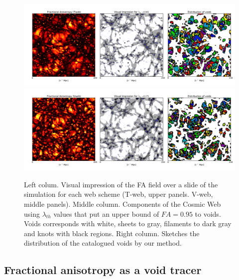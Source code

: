 \documentclass[a4,useAMS,usenatbib,usegraphicx]{latex/mn2e}
\begin{document}
\begin{figure}
  \includegraphics[trim = 16mm 10mm 5mm 12mm, clip, keepaspectratio=true,
  width=0.73\textheight]{./figures/cosmicweb_FA_Tweb.pdf}
  \vspace{0.1 cm}
  \includegraphics[trim = 16mm 10mm 5mm 12mm, clip, keepaspectratio=true,
  width=0.73\textheight]{./figures/cosmicweb_FA_Vweb.pdf}
  \caption{Left colum. Visual impression of the 
  FA field over a slide of the simulation for each web scheme (T-web, upper 
  panels. V-web, middle panels). 
  Middle column. Components of the Cosmic Web using $\lambda_{th}$
  values that put an upper bound of $FA=0.95$ to voids. Voids
  corresponds with white, sheets to gray, filaments to dark gray and
  knots with black regions. 
  Right column. Sketches the distribution of the catalogued voids by
  our method.}
  \label{fig:FA_field}
\end{figure}


\subsection{Fractional anisotropy as a void tracer}
\label{subsec:web_voids}
\end{document}

